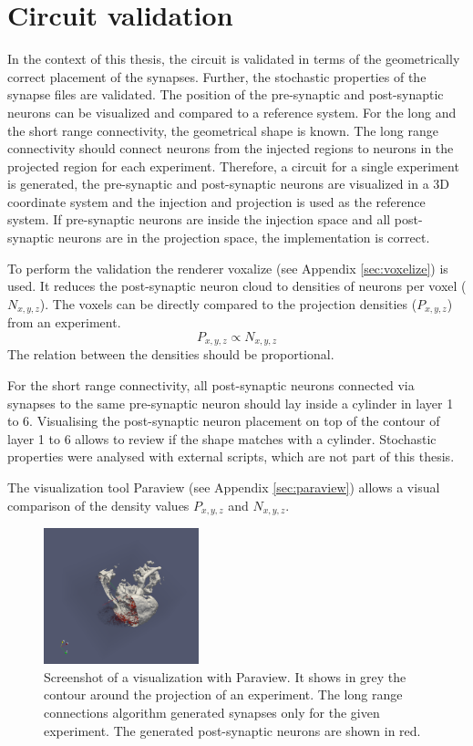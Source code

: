 \section{Circuit validation}
In the context of this thesis, the circuit is validated in terms of the geometrically correct placement of
the synapses. Further, the stochastic properties of the synapse files are validated.
The position of the pre-synaptic and post-synaptic neurons can be visualized and  compared to a 
reference system. For the long and the short range connectivity, the geometrical shape is known.
The long range connectivity should connect neurons from the injected regions to neurons
in the projected region for each experiment. Therefore, a circuit for a single experiment is 
generated, the pre-synaptic and post-synaptic neurons are visualized in a 3D coordinate system and the injection
and projection is used as the reference system. If pre-synaptic neurons are inside the injection space and all
post-synaptic neurons are in the projection space, the implementation is correct.

To perform the validation the renderer voxalize (see Appendix \ref{sec:voxelize}) is used.
It reduces the post-synaptic neuron cloud to densities of neurons per voxel ($N_{x,y,z}$).
The voxels can be directly compared to the projection densities ($P_{x,y,z}$) from an experiment.
\begin{equation}
	P_{x,y,z} \propto N_{x,y,z}
\end{equation}
The relation between the densities should be proportional.

For the short range connectivity, all post-synaptic neurons connected via synapses to the same pre-synaptic neuron should
lay inside a cylinder in layer 1 to 6. Visualising the post-synaptic neuron placement on top of the contour of layer 1 to
6 allows to review if the shape matches with a cylinder.
Stochastic properties were analysed with external scripts, which are not part of this thesis.

The visualization tool Paraview (see Appendix \ref{sec:paraview}) allows a visual comparison of the density values $P_{x,y,z}$ and $N_{x,y,z}$.
 \begin{figure}[ht!]
\centering
\includegraphics[width=0.4\textwidth]{pictures/paraview_ex.png}
\caption[Screenshot of Paraview]{Screenshot of a visualization with Paraview. It shows in grey the contour around the projection of an experiment.
The long range connections algorithm generated synapses only for the given experiment. 
The generated post-synaptic neurons are shown in red.}
\label{fig:paraviewex}
\end{figure}

